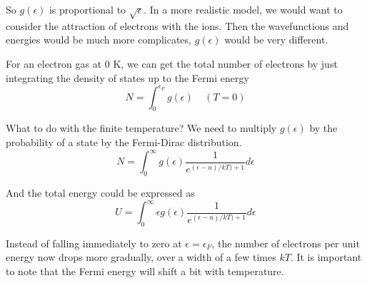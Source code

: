 So $g(\epsilon)$ is proportional to $\sqrt{\epsilon}$. In a more realistic model, we would want to consider the attraction of electrons with the ions.
Then the wavefunctions and energies would be much more complicates, $g(\epsilon)$ would be very different.

For an electron gas at 0 K, we can get the total number of electrons by just integrating the density of states up to the Fermi energy
\begin{equation}
N = \int_0 ^{\epsilon_{F}} g(\epsilon) ~~~~~ (T=0)
\end{equation}

What to do with the finite temperature? We need to multiply $g(\epsilon)$ by the probability of a state by the Fermi-Dirac distribution.
\begin{equation}
N = \int_0 ^\infty g(\epsilon) \frac{1}{e^{(\epsilon-u)/kT)+1}} d\epsilon
\end{equation}

And the total energy could be expressed as 
\begin{equation}
U = \int_0 ^\infty \epsilon g(\epsilon) \frac{1}{e^{(\epsilon-u)/kT)+1}} d\epsilon
\end{equation}

Instead of falling immediately to zero at $\epsilon = \epsilon_F$, the number of electrons per unit energy now drops more gradually, over a width of a few times $kT$.
It is important to note that the Fermi energy will shift a bit with temperature.

